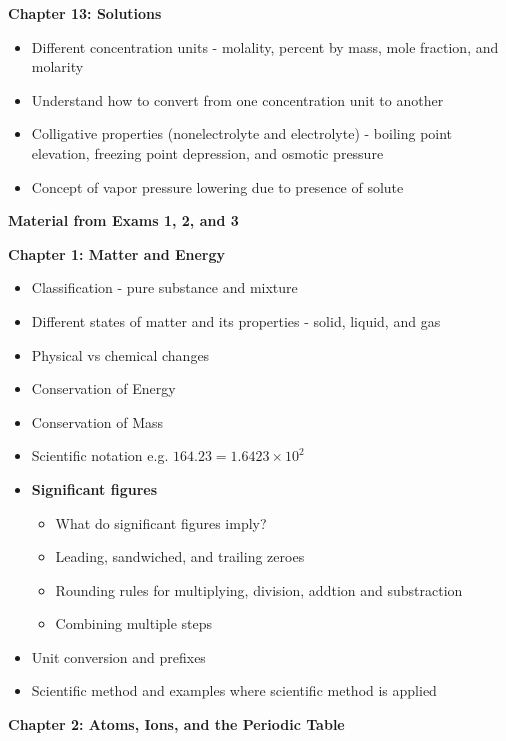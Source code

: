 \documentclass[12pt]{article}
\begin{document}
\textbf{Chapter 13: Solutions}

\begin{itemize}
\item Different concentration units - molality, percent by mass, mole fraction,
  and molarity
\item Understand how to convert from one concentration unit to another
\item Colligative properties (nonelectrolyte and electrolyte) - boiling point elevation,
  freezing point depression, and osmotic pressure
\item Concept of vapor pressure lowering due to presence of solute
\end{itemize}

\begin{Large}
  \textbf{Material from Exams 1, 2, and 3}
\end{Large}

\textbf{Chapter 1: Matter and Energy}

\begin{itemize}
  \setlength\itemsep{0em}
\item Classification - pure substance and mixture
\item Different states of matter and its properties - solid, liquid, and gas
\item Physical vs chemical changes
\item Conservation of Energy
\item Conservation of Mass
\item Scientific notation e.g. $164.23 = 1.6423 \times 10^2$
\item[] \textbf{Significant figures}
  \begin{itemize}
  \item What do significant figures imply?
  \item Leading, sandwiched, and trailing zeroes
  \item Rounding rules for multiplying, division, addtion and substraction
  \item Combining multiple steps
  \end{itemize}
\item Unit conversion and prefixes
\item Scientific method and examples where scientific method is applied
\end{itemize}

\textbf{Chapter 2: Atoms, Ions, and the Periodic Table}
\end{document}
